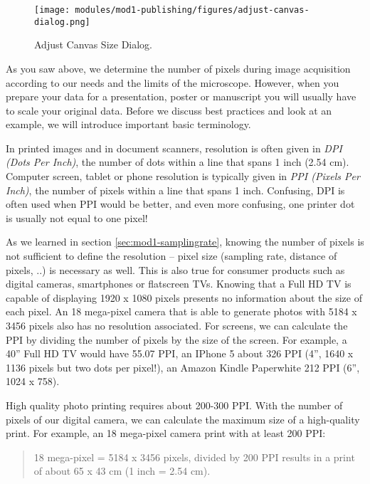 \begin{figure}[!ht]
	\captionsetup{justification=centering}
	\centering
		\texttt{[image: modules/mod1-publishing/figures/adjust-canvas-dialog.png]}
		\caption{Adjust Canvas Size Dialog.}\label{fig:adjust-canvas-dialog}
\end{figure}

As you saw above, we determine the number of pixels during image acquisition according to our needs and the limits of the microscope. However, when you prepare your data for a presentation, poster or manuscript you will usually have to scale your original data. Before we discuss best practices and look at an example, we will introduce important basic terminology.


In printed images and in document scanners, resolution is often given in \emph{DPI (Dots Per Inch)}, the number of dots within a line that spans 1 inch (2.54 cm). Computer screen, tablet or phone resolution is typically given in \emph{PPI (Pixels Per Inch)}, the number of pixels within a line that spans 1 inch. Confusing, DPI is often used when PPI would be better, and even more confusing, one printer dot is usually not equal to one pixel! 

As we learned in section \ref{sec:mod1-samplingrate}, knowing the number of pixels is not sufficient to define the resolution -- pixel size (sampling rate, distance of pixels, ..) is necessary as well. This is also true for consumer products such as digital cameras, smartphones or flatscreen TVs. Knowing that a Full HD TV is capable of displaying 1920 x 1080 pixels presents no information about the size of each pixel. An 18 mega-pixel camera that is able to generate photos with 5184 x 3456 pixels also has no resolution associated. For screens, we can calculate the PPI by dividing the number of pixels by the size of the screen. For example, a 40'' Full HD TV would have 55.07 PPI, an IPhone 5 about 326 PPI (4'', 1640 x 1136 pixels but two dots per pixel!), an Amazon Kindle Paperwhite 212 PPI (6'', 1024 x 758). 

High quality photo printing requires about 200-300 PPI. With the number of pixels of our digital camera, we can calculate the maximum size of a high-quality print. For example, an 18 mega-pixel camera print with at least 200 PPI: 

\begin{quotation}
	18 mega-pixel = 5184 x 3456 pixels, divided by 200 PPI results in a print of about 65 x 43 cm (1 inch = 2.54 cm).
\end{quotation}

